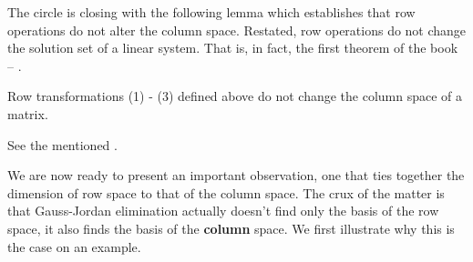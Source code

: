 The circle is closing with the following lemma which establishes that row
operations do not alter the column space. Restated, row operations do not change
the solution set of a linear system. That is, in fact, the first theorem of the
book -- .

\begin{lemma}{}{}
 Row transformations (1) - (3) defined above 
 do not change the column space of a matrix.
\end{lemma}
\begin{lemproof}
 See the mentioned .
\end{lemproof}

We are now ready to present an important observation, one that ties together the
dimension of row space to that of the column space. The crux of the matter is
that Gauss-Jordan elimination actually doesn't find only the basis of the row
space, it also finds the basis of the \textbf{column} space. We first illustrate
why this is the case on an example.


